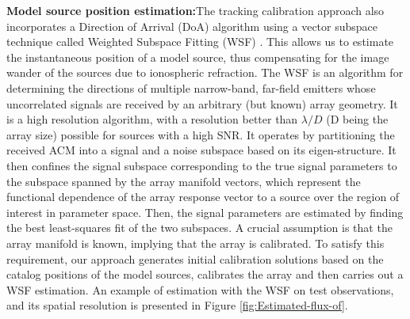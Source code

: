 \documentclass{aa}
\begin{document}
\textbf{Model source position estimation:}The tracking calibration approach also
incorporates  a Direction  of Arrival  (DoA) algorithm  using a  vector subspace
technique  called Weighted  Subspace Fitting  (WSF) \citep{viberg1991detection}.
This allows  us to estimate the  instantaneous position of a  model source, thus
compensating  for   the  image  wander   of  the  sources  due   to  ionospheric
refraction. The WSF  is an algorithm for determining  the directions of multiple
narrow-band, far-field  emitters whose uncorrelated  signals are received  by an
arbitrary (but known) array geometry. It  is a high resolution algorithm, with a
resolution better than $\lambda/D$ (D being the array size) possible for sources
with a high SNR. It operates by  partitioning the received ACM into a signal and
a  noise subspace based  on its  eigen-structure.  It  then confines  the signal
subspace corresponding to the true  signal parameters to the subspace spanned by
the array  manifold vectors,  which represent the  functional dependence  of the
array  response vector  to a  source over  the region  of interest  in parameter
space.  Then,  the   signal  parameters  are  estimated  by   finding  the  best
least-squares fit of  the two subspaces. A crucial assumption  is that the array
manifold  is known,  implying that  the array  is calibrated.   To  satisfy this
requirement, our  approach generates initial calibration solutions  based on the
catalog positions  of the model sources,  calibrates the array  and then carries
out  a  WSF  estimation.   An  example  of  estimation  with  the  WSF  on  test
observations,   and   its   spatial    resolution   is   presented   in   Figure
\ref{fig:Estimated-flux-of}.
\end{document}
